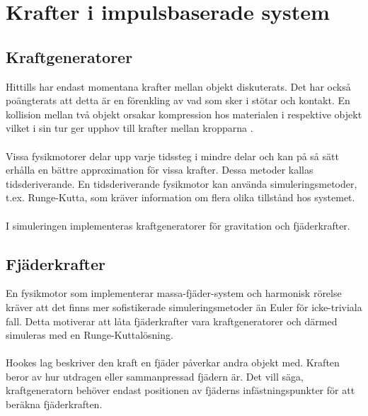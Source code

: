 \documentclass[a4paper,12pt,twopage,swedish]{article}
\begin{document}



\section{Krafter i impulsbaserade system}

\subsection{Kraftgeneratorer}

Hittills har endast momentana krafter mellan objekt diskuterats. Det har också poängterats att detta är en förenkling av vad som sker i stötar och kontakt. En kollision mellan två objekt orsakar kompression hos materialen i respektive objekt vilket i sin tur ger upphov till krafter mellan kropparna \cite{newton87}.
\\
\\Vissa fysikmotorer delar upp varje tidssteg i mindre delar och kan på så sätt erhålla en bättre approximation för vissa krafter. Dessa metoder kallas tidsderiverande. En tidsderiverande fysikmotor kan använda simuleringsmetoder, t.ex. Runge-Kutta, som kräver information om  flera olika tillstånd hos systemet.
\\
\\I simuleringen implementeras kraftgeneratorer för gravitation och fjäderkrafter.


\subsection{Fjäderkrafter}
En fysikmotor som implementerar massa-fjäder-system och harmonisk rörelse kräver att det finns mer sofistikerade simuleringsmetoder än Euler för icke-triviala fall. Detta motiverar att låta fjäderkrafter vara kraftgeneratorer och därmed simuleras med en Runge-Kuttalösning.
\\
\\Hookes lag beskriver den kraft en fjäder påverkar andra objekt med. Kraften beror av hur utdragen eller sammanpressad fjädern är. Det vill säga, kraftgeneratorn behöver endast positionen av fjäderns infästningspunkter för att beräkna fjäderkraften. 
\end{document}

